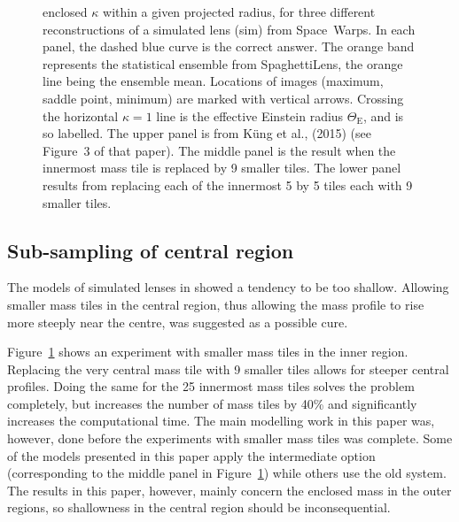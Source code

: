 \documentclass[fleqn,usenatbib]{mnras}
\newcommand{\figref}[1]{\ref{fig:#1}}
\newcommand{\ER}{$\Theta_{\text{E}}$} %
\begin{document}
\begin{figure}
{    enclosed $\kappa$ within a given projected radius, for three
    different reconstructions of a simulated lens (sim) from
    Space~Warps.  In each panel, the dashed blue curve is the correct
    answer.  The orange band represents the statistical ensemble from
    SpaghettiLens, the orange line being the ensemble mean.  Locations of
    images (maximum, saddle point, minimum) are marked with vertical
    arrows.  Crossing the horizontal $\kappa=1$ line is the effective
    Einstein radius \ER, and is so labelled. The upper panel is from
    K\"ung et al., (2015) (see Figure~3 of that paper).  The middle
    panel is the result when the innermost mass tile is replaced by 9
    smaller tiles.  The lower panel results from replacing each of the
    innermost 5 by 5 tiles each with 9 smaller tiles.}
  \label{fig:subsampling}
\end{figure}

\subsection{Sub-sampling of central region}\label{subsec:hires}

The models of simulated lenses in \cite{2015MNRAS.447.2170K} showed a
tendency to be too shallow.  Allowing smaller mass tiles in the
central region, thus allowing the mass profile to rise more steeply
near the centre, was suggested as a possible cure.

Figure~\figref{subsampling} shows an experiment with smaller mass
tiles in the inner region.  Replacing the very central mass tile with
9 smaller tiles allows for steeper central profiles.  Doing the same
for the 25 innermost mass tiles solves the problem completely, but
increases the number of mass tiles by 40\% and significantly increases
the computational time.
The main modelling work in this paper was, however, done before the
experiments with smaller mass tiles was complete.  Some of the models
presented in this paper apply the intermediate option (corresponding
to the middle panel in Figure~\figref{subsampling}) while others use
the old system.  The results in this paper, however, mainly concern
the enclosed mass in the outer regions, so shallowness in the central
region should be inconsequential.
\end{document}
